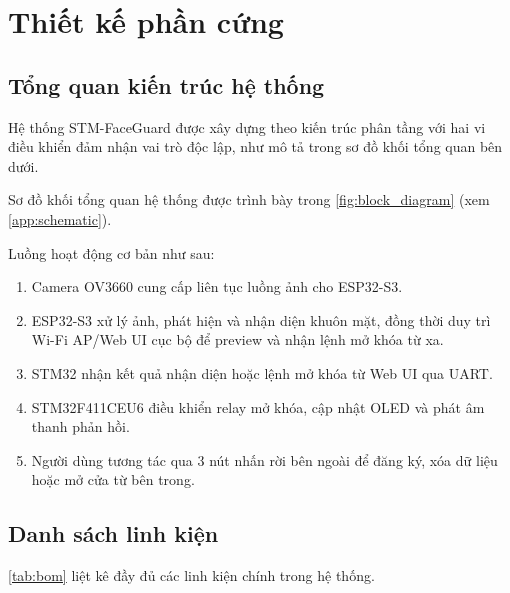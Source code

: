 \chapter{Thiết kế phần cứng}
\label{chap:hardware}

\section{Tổng quan kiến trúc hệ thống}
\label{sec:hw_overview}

Hệ thống STM-FaceGuard được xây dựng theo kiến trúc phân tầng với hai vi điều khiển đảm nhận vai trò độc lập, như mô tả trong sơ đồ khối tổng quan bên dưới.

Sơ đồ khối tổng quan hệ thống được trình bày trong \cref{fig:block_diagram} (xem \cref{app:schematic}).

Luồng hoạt động cơ bản như sau:
\begin{enumerate}[label=\arabic*.]
  \item Camera OV3660 cung cấp liên tục luồng ảnh cho ESP32-S3.
  \item ESP32-S3 xử lý ảnh, phát hiện và nhận diện khuôn mặt, đồng thời duy trì Wi-Fi AP/Web UI cục bộ để preview và nhận lệnh mở khóa từ xa.
  \item STM32 nhận kết quả nhận diện hoặc lệnh mở khóa từ Web UI qua UART.
  \item STM32F411CEU6 điều khiển relay mở khóa, cập nhật OLED và phát âm thanh phản hồi.
  \item Người dùng tương tác qua 3 nút nhấn rời bên ngoài để đăng ký, xóa dữ liệu hoặc mở cửa từ bên trong.
\end{enumerate}

\section{Danh sách linh kiện}
\label{sec:components}

\cref{tab:bom} liệt kê đầy đủ các linh kiện chính trong hệ thống.

